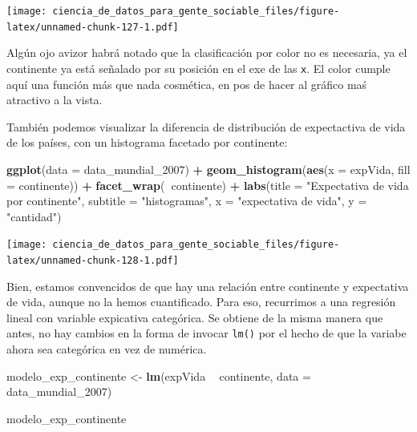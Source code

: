 \documentclass[]{book}
\newenvironment{Shaded}{\begin{snugshade}}{\end{snugshade}}
\newcommand{\KeywordTok}[1]{\textcolor[rgb]{0.13,0.29,0.53}{\textbf{#1}}}
\newcommand{\DataTypeTok}[1]{\textcolor[rgb]{0.13,0.29,0.53}{#1}}
\newcommand{\DecValTok}[1]{\textcolor[rgb]{0.00,0.00,0.81}{#1}}
\newcommand{\StringTok}[1]{\textcolor[rgb]{0.31,0.60,0.02}{#1}}
\newcommand{\OperatorTok}[1]{\textcolor[rgb]{0.81,0.36,0.00}{\textbf{#1}}}
\newcommand{\NormalTok}[1]{#1}
\begin{document}
\texttt{[image: ciencia\_de\_datos\_para\_gente\_sociable\_files/figure-latex/unnamed-chunk-127-1.pdf]}

Algún ojo avizor habrá notado que la clasificación por color no es
necesaria, ya el continente ya está señalado por su posición en el exe
de las \texttt{x}. El color cumple aquí una función más que nada
cosmética, en pos de hacer al gráfico maś atractivo a la vista.

También podemos visualizar la diferencia de distribución de expectactiva
de vida de los países, con un histograma facetado por continente:

\begin{Shaded}
\begin{Highlighting}[]
\KeywordTok{ggplot}\NormalTok{(}\DataTypeTok{data =}\NormalTok{ data_mundial_}\DecValTok{2007}\NormalTok{) }\OperatorTok{+}
\StringTok{    }\KeywordTok{geom_histogram}\NormalTok{(}\KeywordTok{aes}\NormalTok{(}\DataTypeTok{x =}\NormalTok{ expVida, }\DataTypeTok{fill =}\NormalTok{ continente)) }\OperatorTok{+}
\StringTok{    }\KeywordTok{facet_wrap}\NormalTok{(}\OperatorTok{~}\NormalTok{continente) }\OperatorTok{+}
\StringTok{    }\KeywordTok{labs}\NormalTok{(}\DataTypeTok{title =} \StringTok{"Expectativa de vida por continente"}\NormalTok{,}
         \DataTypeTok{subtitle =} \StringTok{"histogramas"}\NormalTok{,}
        \DataTypeTok{x =} \StringTok{"expectativa de vida"}\NormalTok{,}
        \DataTypeTok{y =} \StringTok{"cantidad"}\NormalTok{)}
\end{Highlighting}
\end{Shaded}

\texttt{[image: ciencia\_de\_datos\_para\_gente\_sociable\_files/figure-latex/unnamed-chunk-128-1.pdf]}

Bien, estamos convencidos de que hay una relación entre continente y
expectativa de vida, aunque no la hemos cuantificado. Para eso,
recurrimos a una regresión lineal con variable expicativa categórica. Se
obtiene de la misma manera que antes, no hay cambios en la forma de
invocar \texttt{lm()} por el hecho de que la variabe ahora sea
categórica en vez de numérica.

\begin{Shaded}
\begin{Highlighting}[]
\NormalTok{modelo_exp_continente <-}\StringTok{ }\KeywordTok{lm}\NormalTok{(expVida }\OperatorTok{~}\StringTok{ }\NormalTok{continente, }\DataTypeTok{data =}\NormalTok{ data_mundial_}\DecValTok{2007}\NormalTok{)}


\NormalTok{modelo_exp_continente}
\end{Highlighting}
\end{Shaded}
\end{document}
